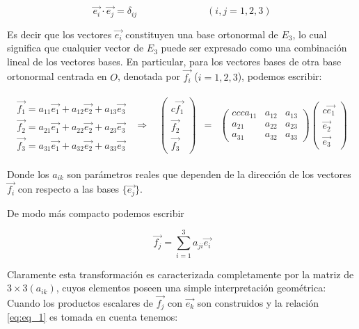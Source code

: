 \begin{equation}
  \vec{e_i}\cdot\vec{e_j}=\delta_{ij} \hspace{3cm}(i,j=1,2,3)
  \label{eq:eq_1}
\end{equation}

Es decir que los vectores $\vec{e_i}$ constituyen una base ortonormal de $E_3$, lo cual significa que cualquier vector de $E_3$ puede ser expresado como una combinación lineal de los vectores bases. En particular, para los vectores bases de otra base ortonormal centrada en $O$, denotada por $\vec{f_i}$   ($i=1,2,3$), podemos escribir:

\begin{eqnarray*}
  \begin{array}{c}
    \vec{f_1}=a_11\vec{e_1}+a_12\vec{e_2}+a_13\vec{e_3} \\
    \vec{f_2}=a_21\vec{e_1}+a_22\vec{e_2}+a_23\vec{e_3} \\
    \vec{f_3}=a_31\vec{e_1}+a_32\vec{e_2}+a_33\vec{e_3}
  \end{array}
  &\Rightarrow&
  \begin{array}{lcr}
    \begin{pmatrix}{c}
      \vec{f_1}\\
      \vec{f_2}\\
      \vec{f_3}
    \end{pmatrix}

     & = &
    \begin{pmatrix}{c c c}
      a_11 & a_12 & a_13 \\
      a_21 & a_22 & a_23 \\
      a_31 & a_32 & a_33
    \end{pmatrix}
    \begin{pmatrix}{c}
      \vec{e_1} \\
      \vec{e_2} \\
      \vec{e_3}
    \end{pmatrix}
  \end{array}
\end{eqnarray*}

Donde los $a_{ik}$ son parámetros reales que dependen de la dirección de los vectores $\vec{f_i}$ con respecto a las bases $\{\vec{e_j}\}$.

De modo más compacto podemos escribir

$$\vec{f_j}=\sum^{3}_{i=1}a_{ji}\vec{e_i}$$

Claramente esta transformación es caracterizada completamente por la matriz de $3\times 3 (a_{ik})$, cuyos elementos poseen una simple interpretación geométrica: Cuando los productos escalares de $\vec{f_j}$ con $\vec{e_k}$ son construidos y la relación \eqref{eq:eq_1} es tomada en cuenta tenemos:

